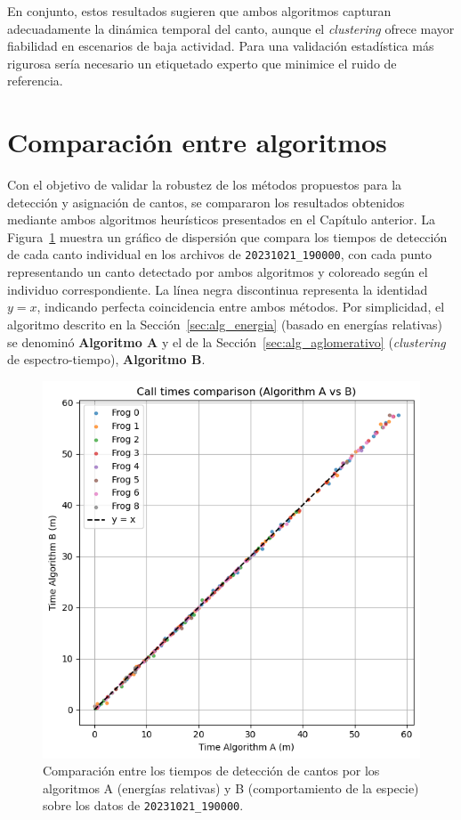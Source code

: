 En conjunto, estos resultados sugieren que ambos algoritmos 
capturan adecuadamente la dinámica temporal del canto, aunque 
el \textit{clustering} ofrece mayor fiabilidad en escenarios de baja 
actividad. Para una validación estadística más rigurosa sería 
necesario un etiquetado experto que minimice el ruido de 
referencia.


\section{Comparación entre algoritmos}
\label{sec:res_comparacion}


Con el objetivo de validar la robustez de los métodos propuestos 
para la detección y asignación de cantos, se compararon los 
resultados obtenidos mediante ambos algoritmos heurísticos 
presentados en el Capítulo anterior. 
La Figura~\ref{fig:alg_comparison} muestra un gráfico de 
dispersión que compara los tiempos de detección de cada canto 
individual en los archivos de \texttt{20231021\_190000}, con cada 
punto representando un canto detectado por ambos algoritmos y 
coloreado según el individuo correspondiente. La línea negra 
discontinua representa la identidad \( y = x \), indicando 
perfecta coincidencia entre ambos métodos. Por simplicidad,
el algoritmo descrito en la Sección~\ref{sec:alg_energia} (basado en energías relativas) 
se denominó \textbf{Algoritmo A} y el de la Sección~\ref{sec:alg_aglomerativo} (\emph{clustering} de espectro-tiempo),
\textbf{Algoritmo B}.

\begin{figure}[ht]
    \centering
    \includegraphics[width=0.7\linewidth]{Graphics/times_comparison.png}
    \caption{Comparación entre los tiempos de detección de cantos por los algoritmos A (energías relativas) y B (comportamiento de la especie) sobre los datos de \texttt{20231021\_190000}.}
    \label{fig:alg_comparison}
\end{figure}

